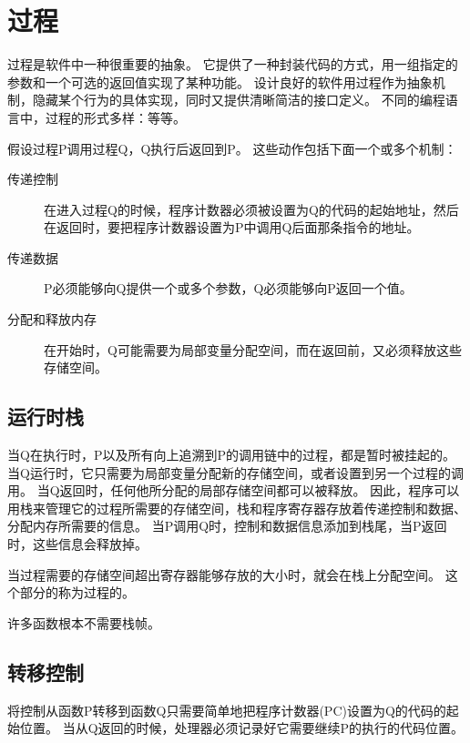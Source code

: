 
\section{过程}
{
    过程是软件中一种很重要的抽象。
    它提供了一种封装代码的方式，用一组指定的参数和一个可选的返回值实现了某种功能。
    设计良好的软件用过程作为抽象机制，隐藏某个行为的具体实现，同时又提供清晰简洁的接口定义。
    不同的编程语言中，过程的形式多样：等等。

    假设过程P调用过程Q，Q执行后返回到P。
    这些动作包括下面一个或多个机制：

    \begin{description}
        \item[传递控制] 在进入过程Q的时候，程序计数器必须被设置为Q的代码的起始地址，然后在返回时，要把程序计数器设置为P中调用Q后面那条指令的地址。
        \item[传递数据] P必须能够向Q提供一个或多个参数，Q必须能够向P返回一个值。
        \item[分配和释放内存] 在开始时，Q可能需要为局部变量分配空间，而在返回前，又必须释放这些存储空间。
    \end{description}

    \subsection{运行时栈}
    {
        当Q在执行时，P以及所有向上追溯到P的调用链中的过程，都是暂时被挂起的。
        当Q运行时，它只需要为局部变量分配新的存储空间，或者设置到另一个过程的调用。
        当Q返回时，任何他所分配的局部存储空间都可以被释放。
        因此，程序可以用栈来管理它的过程所需要的存储空间，栈和程序寄存器存放着传递控制和数据、分配内存所需要的信息。
        当P调用Q时，控制和数据信息添加到栈尾，当P返回时，这些信息会释放掉。

        当过程需要的存储空间超出寄存器能够存放的大小时，就会在栈上分配空间。
        这个部分的称为过程的。

        许多函数根本不需要栈帧。
    }

    \subsection{转移控制}
    {
        将控制从函数P转移到函数Q只需要简单地把程序计数器(PC)设置为Q的代码的起始位置。
        当从Q返回的时候，处理器必须记录好它需要继续P的执行的代码位置。

}}
